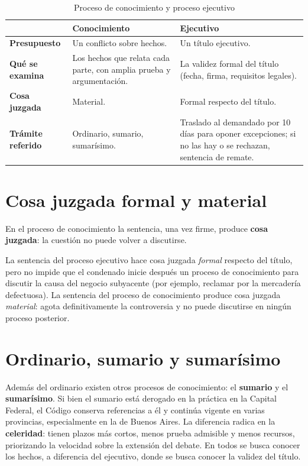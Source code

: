 \documentclass[12pt,oneside]{book}
\begin{document}
\begin{table}[H]
\centering
\caption{Proceso de conocimiento y proceso ejecutivo}
\begin{tabularx}{\textwidth}{>{\raggedright\arraybackslash\bfseries}p{} X X}
\toprule
 & Conocimiento & Ejecutivo \\
\midrule
Presupuesto & Un conflicto sobre hechos. & Un título ejecutivo. \\
Qué se examina & Los hechos que relata cada parte, con amplia prueba y argumentación. & La validez formal del título (fecha, firma, requisitos legales). \\
Cosa juzgada & Material. & Formal respecto del título. \\
Trámite referido & Ordinario, sumario, sumarísimo. & Traslado al demandado por 10 días para oponer excepciones; si no las hay o se rechazan, sentencia de remate. \\
\bottomrule
\end{tabularx}
\end{table}

\section{Cosa juzgada formal y material}

En el proceso de conocimiento la sentencia, una vez firme, produce \textbf{cosa juzgada}: la cuestión no puede volver a discutirse.

\begin{importante}
La sentencia del proceso ejecutivo hace cosa juzgada \emph{formal} respecto del título, pero no impide que el condenado inicie después un proceso de conocimiento para discutir la causa del negocio subyacente (por ejemplo, reclamar por la mercadería defectuosa). La sentencia del proceso de conocimiento produce cosa juzgada \emph{material}: agota definitivamente la controversia y no puede discutirse en ningún proceso posterior.
\end{importante}

\section{Ordinario, sumario y sumarísimo}

Además del ordinario existen otros procesos de conocimiento: el \textbf{sumario} y el \textbf{sumarísimo}. Si bien el sumario está derogado en la práctica en la Capital Federal, el Código conserva referencias a él y continúa vigente en varias provincias, especialmente en la de Buenos Aires. La diferencia radica en la \textbf{celeridad}: tienen plazos más cortos, menos prueba admisible y menos recursos, priorizando la velocidad sobre la extensión del debate. En todos se busca conocer los hechos, a diferencia del ejecutivo, donde se busca conocer la validez del título.
\end{document}
